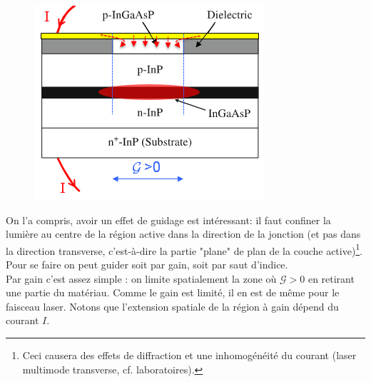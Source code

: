 	\begin{figure}
	\vspace{-5mm}
	\includegraphics[scale=0.6]{ch5/image42}
	\end{figure}	
		On l'a compris, avoir un effet de guidage est intéressant: il faut confiner la lumière au 
		centre de la région active dans la direction de la jonction (et pas dans la direction 
		transverse, c'est-à-dire la partie "plane" de plan de la couche active)\footnote{Ceci causera
		des effets de diffraction et une inhomogénéité du courant (laser multimode transverse, cf. 
		laboratoires).}. Pour se faire on peut guider soit par gain, soit par saut d'indice.\\
		
		Par gain c'est assez simple : on limite spatialement la zone où $\mathcal{G}>0$ en retirant
		une partie du matériau. Comme le gain est limité, il en est de même pour le faisceau laser. 
		Notons que l'extension spatiale de la région à gain dépend du courant $I$.\\
		
